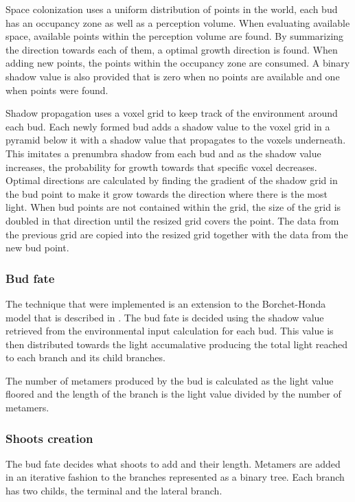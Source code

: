 \documentclass[11pt]{article} %
\begin{document}
Space colonization uses a uniform distribution of points in the world, each bud has an occupancy zone as well as a perception volume.
When evaluating available space, available points within the perception volume are found.
By summarizing the direction towards each of them, a optimal growth direction is found.
When adding new points, the points within the occupancy zone are consumed.
A binary shadow value is also provided that is zero when no points are available and one when points were found.

Shadow propagation uses a voxel grid to keep track of the environment around each bud.
Each newly formed bud adds a shadow value to the voxel grid in a pyramid below it with a shadow value that propagates to the voxels underneath.
This imitates a prenumbra shadow from each bud and as the shadow value increases, the probability for growth towards that specific voxel decreases.
Optimal directions are calculated by finding the gradient of the shadow grid in the bud point to make it grow towards the direction where there is the most light.
When bud points are not contained within the grid, the size of the grid is doubled in that direction until the resized grid covers the point.
The data from the previous grid are copied into the resized grid together with the data from the new bud point.

\subsubsection{Bud fate}
The technique that were implemented is an extension to the Borchet-Honda model that is described in \citet{Pablucki}.
The bud fate is decided using the shadow value retrieved from the environmental input calculation for each bud.
This value is then distributed towards the light accumalative producing the total light reached to each branch and its child branches.

The number of metamers produced by the bud is calculated as the light value floored and the length of the branch is the light value divided by the number of metamers.

\subsubsection{Shoots creation}
The bud fate decides what shoots to add and their length.
Metamers are added in an iterative fashion to the branches represented as a binary tree.
Each branch has two childs, the terminal and the lateral branch.
\end{document}
